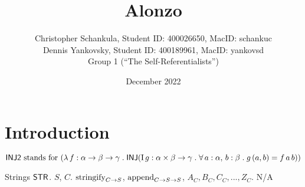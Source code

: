 \documentclass{article}
\title{Alo\color{lightgray}{alonzo}\color{black}nzo}
\author{Christopher Schankula, Student ID: 400026650, MacID: schankuc\\ Dennis Yankovsky, Student ID: 400189961, MacID: yankovsd\\Group 1 (``The Self-Referentialists'')}
\date{December 2022}
\begin{document}
\maketitle

\section{Introduction}

$\mathsf{INJ2} \text{ stands for }
(\lambda\, f : {\alpha} \rightarrow {{\beta} \rightarrow {\gamma}} \mathrel{.} \mathsf{INJ}(\mathrm{I}\, g : {\alpha \times \beta} \rightarrow {\gamma} \mathrel{.} \forall\, a : \alpha,\, b : \beta \mathrel{.} g\,(a,b) = f\,a\,b))
$

\newpage
\begin{theory-def}
{Strings}
{$\mathsf{STR}$.}
{$S$, $C$.}
{$\text{stringify}_{{C} \rightarrow {S}}$, $\text{append}_{{C} \rightarrow {{S} \rightarrow {S}}}$,
$A_C, B_C, C_C, ... , Z_C$.}
{N/A}
{}
\end{theory-def}
\end{document}
